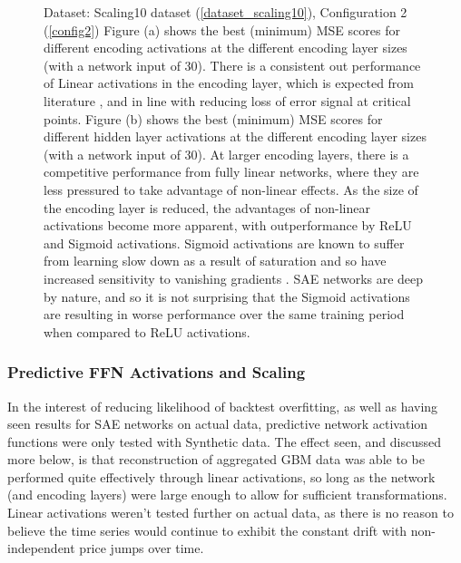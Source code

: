 \documentclass[a4paper,11pt,oneside]{article}
\theoremstyle{plain}
\theoremstyle{definition}
\begin{document}
\begin{figure}[H]
		\caption[MSE by Activations and Encoding Layer Size]
		{Dataset: Scaling10 dataset (\ref{dataset_scaling10}), Configuration 2 (\ref{config2})
			\newline Figure (a) shows the best (minimum) MSE scores for different encoding activations at the different encoding layer sizes (with a network input of 30). There is a consistent out performance of Linear activations in the encoding layer, which is expected from literature \citep{Hinton2}, and in line with reducing loss of error signal at critical points. 
			\newline Figure (b) shows the best (minimum) MSE scores for different hidden layer activations at the different encoding layer sizes (with a network input of 30). At larger encoding layers, there is a competitive performance from fully linear networks, where they are less pressured to take advantage of non-linear effects. As the size of the encoding layer is reduced, the advantages of non-linear activations become more apparent, with outperformance by ReLU and Sigmoid activations. Sigmoid activations are known to suffer from learning slow down as a result of saturation and so have increased sensitivity to vanishing gradients \citep{Glorot2}. SAE networks are deep by nature, and so it is not surprising that the Sigmoid activations are resulting in worse performance over the same training period when compared to ReLU activations. \newline}
		\label{figure-mse_encoding_activations}
	\end{figure}
	
	
	\subsubsection{Predictive FFN Activations and Scaling}
	
	In the interest of reducing likelihood of backtest overfitting, as well as having seen results for SAE networks on actual data, predictive network activation functions were only tested with Synthetic data.	The effect seen, and discussed more below, is that reconstruction of aggregated GBM data was able to be performed quite effectively through linear activations, so long as the network (and encoding layers) were large enough to allow for sufficient transformations. Linear activations weren't tested further on actual data, as there is no reason to believe the time series would continue to exhibit the constant drift with non-independent price jumps over time. 
	
\end{document}
